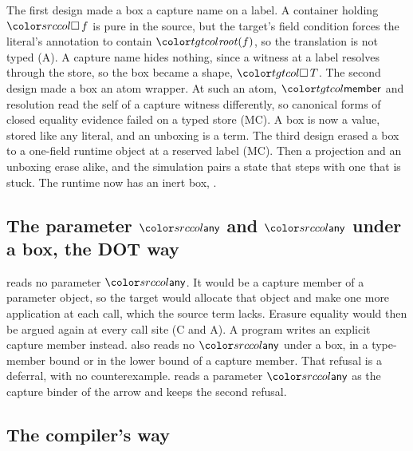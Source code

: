The first design made a box a capture name on a label. A container holding $\dbox{f}$ is pure in the source, but the target's field condition forces the literal's annotation to contain $\rt{f}$, so the translation is not typed (A). A capture name hides nothing, since a witness at a label resolves through the store, so the box became a shape, $\boxt{T}$. The second design made a box an atom wrapper. At such an atom, $\ev{member}$ and resolution read the self of a capture witness differently, so canonical forms of closed equality evidence failed on a typed store (MC). A box is now a value, stored like any literal, and an unboxing is a term. The third design erased a box to a one-field runtime object at a reserved label (MC). Then a projection and an unboxing erase alike, and the simulation pairs a state that steps with one that is stuck. The runtime now has an inert box, .

\subsection{The parameter \texorpdfstring{$\cany$}{any} and \texorpdfstring{$\cany$}{any} under a box, the DOT way}

\treeK reads no parameter $\cany$. It would be a capture member of a parameter object, so the target would allocate that object and make one more application at each call, which the source term lacks. Erasure equality would then be argued again at every call site (C and A). A program writes an explicit capture member instead. \treeK also reads no $\cany$ under a box, in a type-member bound or in the lower bound of a capture member. That refusal is a deferral, with no counterexample. \treeCC reads a parameter $\cany$ as the capture binder of the arrow and keeps the second refusal.

\subsection{The compiler's way}


